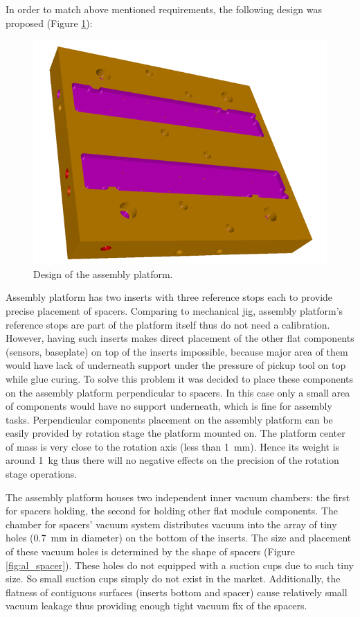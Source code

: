 In order to match above mentioned requirements, the following design was proposed (Figure \ref{fig:platform_design}):

\begin{figure}[ht]\centering
\includegraphics[width=0.7\linewidth]{Data/Module_assembly/Platform_design.png}
\caption{Design of the assembly platform.}
\label{fig:platform_design}
\end{figure}

Assembly platform has two inserts with three reference stops each to provide precise placement of spacers. Comparing to mechanical jig, assembly platform's reference stops are part of the platform itself thus do not need a calibration. However, having such inserts makes direct placement of the other flat components (sensors, baseplate) on top of the inserts impossible, because major area of them would have lack of underneath support under the pressure of pickup tool on top while glue curing. To solve this problem it was decided to place these components on the assembly platform perpendicular to spacers. In this case only a small area of components would have no support underneath, which is fine for assembly tasks. Perpendicular components placement on the assembly platform can be easily provided by rotation stage the platform mounted on. The platform center of mass is very close to the rotation axis (less than 1~mm). Hence its weight is around 1~kg thus there will no negative effects on the precision of the rotation stage operations. 

The assembly platform houses two independent inner vacuum chambers: the first for spacers holding, the second for holding other flat module components. The chamber for spacers' vacuum system distributes vacuum into the array of tiny holes (0.7~mm in diameter) on the bottom of the inserts. The size and placement of these vacuum holes is determined by the shape of spacers (Figure \ref{fig:al_spacer}). These holes do not equipped with a suction cups due to such tiny size. So small suction cups simply do not exist in the market. Additionally, the flatness of contiguous surfaces (inserts bottom and spacer) cause relatively small vacuum leakage thus providing enough tight vacuum fix of the spacers.

